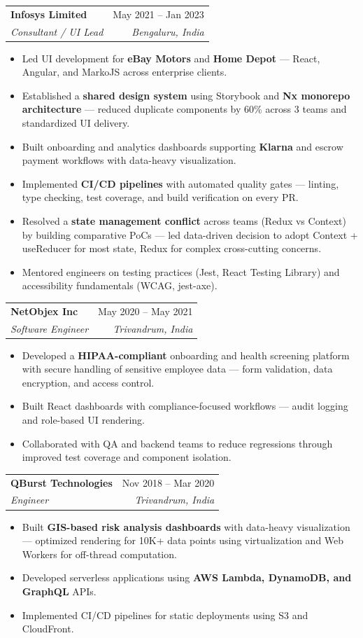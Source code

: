 \documentclass[11pt,a4paper]{article}
\makeatletter
\newcommand{\job}[4]{
\vspace{4pt}
\begin{tabular*}{\textwidth}{l@{\extracolsep{\fill}}r}
\textbf{#1} & #2 \\
\textit{#3} & \textit{#4} \\
\end{tabular*}
\vspace{2pt}
}
\makeatother
\begin{document}
\job
{Infosys Limited}
{May 2021 -- Jan 2023}
{Consultant / UI Lead}
{Bengaluru, India}

\begin{itemize}
\item Led UI development for \textbf{eBay Motors} and \textbf{Home Depot} — React, Angular, and MarkoJS across enterprise clients.
\item Established a \textbf{shared design system} using Storybook and \textbf{Nx monorepo architecture} — reduced duplicate components by 60\% across 3 teams and standardized UI delivery.
\item Built onboarding and analytics dashboards supporting \textbf{Klarna} and escrow payment workflows with data-heavy visualization.
\item Implemented \textbf{CI/CD pipelines} with automated quality gates — linting, type checking, test coverage, and build verification on every PR.
\item Resolved a \textbf{state management conflict} across teams (Redux vs Context) by building comparative PoCs — led data-driven decision to adopt Context + useReducer for most state, Redux for complex cross-cutting concerns.
\item Mentored engineers on testing practices (Jest, React Testing Library) and accessibility fundamentals (WCAG, jest-axe).
\end{itemize}

\job
{NetObjex Inc}
{May 2020 -- May 2021}
{Software Engineer}
{Trivandrum, India}

\begin{itemize}
\item Developed a \textbf{HIPAA-compliant} onboarding and health screening platform with secure handling of sensitive employee data — form validation, data encryption, and access control.
\item Built React dashboards with compliance-focused workflows — audit logging and role-based UI rendering.
\item Collaborated with QA and backend teams to reduce regressions through improved test coverage and component isolation.
\end{itemize}

\job
{QBurst Technologies}
{Nov 2018 -- Mar 2020}
{Engineer}
{Trivandrum, India}

\begin{itemize}
\item Built \textbf{GIS-based risk analysis dashboards} with data-heavy visualization — optimized rendering for 10K+ data points using virtualization and Web Workers for off-thread computation.
\item Developed serverless applications using \textbf{AWS Lambda, DynamoDB, and GraphQL} APIs.
\item Implemented CI/CD pipelines for static deployments using S3 and CloudFront.
\end{itemize}
\end{document}
